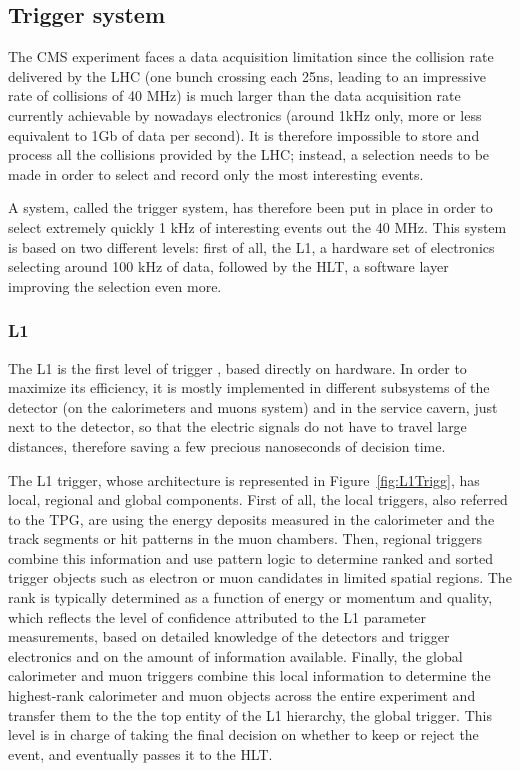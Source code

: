 \documentclass[a4paper, 10pt, openright]{report}
\begin{document}
\subsection{Trigger system} \label{subsection:Trigger}

The \ac{CMS} experiment faces a data acquisition limitation since the collision rate delivered by the \ac{LHC} (one bunch crossing each 25ns, leading to an impressive rate of collisions of 40 MHz) is much larger than the data acquisition rate currently achievable by nowadays electronics (around 1kHz only, more or less equivalent to 1Gb of data per second). It is therefore impossible to store and process all the collisions provided by the \ac{LHC}; instead, a selection needs to be made in order to select and record only the most interesting events.

A system, called the trigger system, has therefore been put in place in order to select extremely quickly 1 kHz of interesting events out the 40 MHz. This system is based on two different levels: first of all, the \ac{L1}, a hardware set of electronics selecting around 100 kHz of data, followed by the \ac{HLT}, a software layer improving the selection even more.%

\subsubsection*{\acf{L1}}

The \ac{L1} is the first level of trigger \cite{L1}, based directly on hardware. In order to maximize its efficiency, it is mostly implemented in different subsystems of the detector (on the calorimeters and muons system) and in the service cavern, just next to the detector, so that the electric signals do not have to travel large distances, therefore saving a few precious nanoseconds of decision time. 

The L1 trigger, whose architecture is represented in Figure~\ref{fig:L1Trigg}, has local, regional and global components. First of all, the local triggers, also referred to the \ac{TPG}, are using the energy deposits measured in the calorimeter and the track segments or hit patterns in the muon chambers. Then, regional triggers combine this information and use pattern logic to determine ranked and sorted trigger objects
such as electron or muon candidates in limited spatial regions. The rank is typically determined as a function of energy or momentum and quality, which reflects the level of confidence attributed to the L1 parameter measurements, based on detailed knowledge of the detectors and trigger electronics
and on the amount of information available. Finally, the global calorimeter and muon triggers combine this local information to determine the highest-rank calorimeter and muon objects across the entire experiment and transfer them to the the top entity of the L1 hierarchy, the global trigger. This level is in charge of taking the final decision on whether to keep or reject the event, and eventually passes it to the \ac{HLT}.
\end{document}
